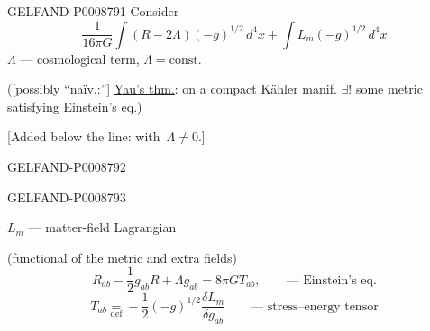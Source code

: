 \begin{GelfandAdjacentEvidence}{GELFAND-P000879}{1}
Consider
\begin{equation*}
\frac{1}{16\pi G}\int(R-2\Lambda)(-g)^{1/2}\,d^4x
+\int L_m(-g)^{1/2}\,d^4x
\tag{1}
\end{equation*}
$\Lambda$ --- cosmological term, $\Lambda=\mathrm{const}$.

([possibly “naïv.:”] \uline{Yau's thm.}: on a compact Kähler manif. $\exists!$ some metric satisfying Einstein's eq.)

[Added below the line: with $\,\Lambda\ne0$.]
\end{GelfandAdjacentEvidence}
\begin{GelfandAdjacentEvidence}{GELFAND-P000879}{2}


\end{GelfandAdjacentEvidence}
\begin{GelfandAdjacentEvidence}{GELFAND-P000879}{3}


$L_m$ --- matter-field Lagrangian

(functional of the metric and extra fields)
\begin{equation*}
R_{ab}-\frac12 g_{ab}R+\Lambda g_{ab}=8\pi G T_{ab},
\qquad\text{--- Einstein's eq.}
\tag{2}
\end{equation*}
\begin{equation*}
T_{ab}\underset{\mathrm{def}}{=}-\frac12(-g)^{1/2}
\frac{\delta L_m}{\delta g_{ab}}
\qquad\text{--- stress–energy tensor}
\tag{3}
\end{equation*}
\end{GelfandAdjacentEvidence}

